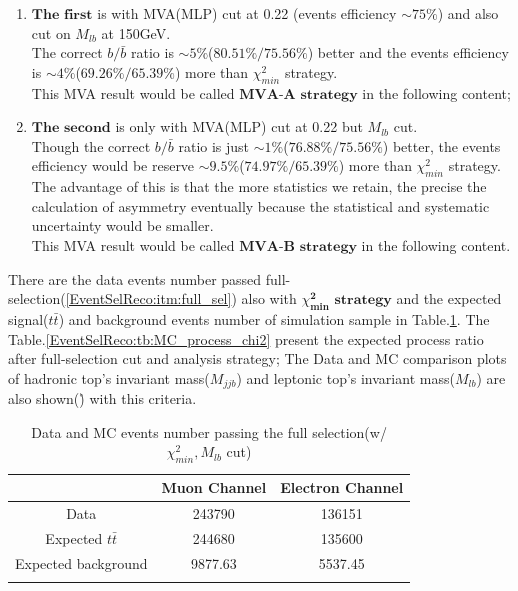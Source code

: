 		\begin{enumerate}
			\item $\textbf{The first}$ is with MVA(MLP) cut at 0.22 (events efficiency $\sim 75\%$) and also cut on $M_{lb}$ at 150GeV.\\ 
			The correct $b/\bar{b}$ ratio is $\sim 5 \%$($80.51 \%/75.56 \%$) better and the events efficiency is $\sim 4 \%$($69.26 \%/65.39 \%$) more than $\chi^2_{min}$ strategy.\\
			This MVA result would be called $\textbf{MVA-A}$ $\textbf{strategy}$ in the following content;
			\item $\textbf{The second}$ is only with MVA(MLP) cut at 0.22 but $M_{lb}$ cut. \\
			Though the correct $b/\bar{b}$ ratio is just $\sim 1 \%$($76.88 \%/75.56 \%$) better, the events efficiency would be reserve $\sim 9.5 \%$($74.97 \%/65.39 \%$) more than $\chi^2_{min}$ strategy. The advantage of this is that the more statistics we retain, the precise the calculation of asymmetry eventually because the statistical and systematic uncertainty would be smaller.\\
			This MVA result would be called $\textbf{MVA-B}$ $\textbf{strategy}$ in the following content.
		\label{EventSelReco:itm:a05_samples}
		\end{enumerate}


		There are the data events number passed full-selection(\ref{EventSelReco:itm:full_sel}) also with $\chi^{\textbf{2}}_{\textbf{min}}$ $\textbf{strategy}$ and the expected signal($t\bar{t}$) and background events number of simulation sample in Table.\ref{EventSelReco:tb:DataMC_expected_chi2}. The Table.\ref{EventSelReco:tb:MC_process_chi2} present the expected process ratio after full-selection cut and analysis strategy; The Data and MC comparison plots of hadronic top's invariant mass($M_{jjb}$) and leptonic top's invariant mass($M_{lb}$) are also shown(\r) with this criteria.

		\begin{center}
		\begin{longtable}[H]{ c c c }
		\caption{Data and MC events number passing the full selection(w/ $\chi^2_{min}, M_{lb}$ cut)} \\
		\hline
		 & Muon Channel & Electron Channel \\ 
		\hline
		 Data & 243790 & 136151 \\
		\hline
		 Expected $t\bar{t}$ & 244680 & 135600 \\
		 Expected background & 9877.63 & 5537.45 \\
		\hline
		\label{EventSelReco:tb:DataMC_expected_chi2}
		\end{longtable}
		\end{center}
		\FloatBarrier

